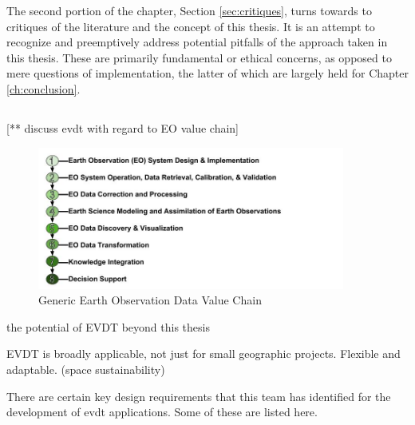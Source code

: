 The second portion of the chapter, Section \ref{sec:critiques}, turns towards to critiques of the literature and the concept of this thesis. It is an attempt to recognize and preemptively address potential pitfalls of the approach taken in this thesis. These are primarily fundamental or ethical concerns, as opposed to mere questions of implementation, the latter of which are largely held for Chapter \ref{ch:conclusion}.

\subsection{}

\subsection{}

\subsection{} \label{sec:future}


[** discuss evdt with regard to EO value chain]

\begin{figure}[h]
\centering
\includegraphics[width=0.9\textwidth]{Figures/chap6/EOChain.jpg}
\caption[Generic Earth Observation Data Value Chain]{Generic Earth Observation Data Value Chain}
\label{fig:eochain}
\end{figure}

the potential of EVDT beyond this thesis 

EVDT is broadly applicable, not just for small geographic projects. Flexible and adaptable.
 (space sustainability)
 


There are certain key design requirements that this team has identified for the development of \ac{evdt} applications. Some of these are listed here.

